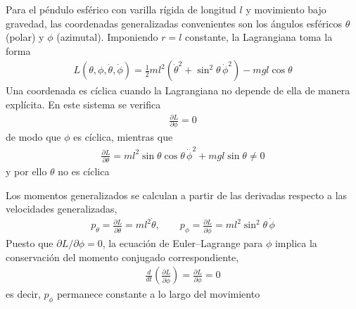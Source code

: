 \documentclass{article}
\begin{document}
Para el péndulo esférico con varilla rígida de longitud $l$ y movimiento bajo gravedad, las coordenadas generalizadas convenientes son los ángulos esféricos $\theta$ (polar) y $\phi$ (azimutal). Imponiendo $r=l$ constante, la Lagrangiana toma la forma
\begin{equation}
\begin{split}
L(\theta,\phi,\dot\theta,\dot\phi)
= \tfrac12 m l^2\!\left(\dot\theta^2 + \sin^2\theta\,\dot\phi^2\right) - m g l \cos\theta
\end{split}\label{eq:L-pendulo-esferico-ampliada}
\end{equation}
Una coordenada es cíclica cuando la Lagrangiana no depende de ella de manera explícita. En este sistema se verifica
\begin{equation}
\begin{split}
\frac{\partial L}{\partial \phi} = 0
\end{split}\label{eq:phi-ciclica-ampliada}
\end{equation}
de modo que $\phi$ es cíclica, mientras que
\begin{equation}
\begin{split}
\frac{\partial L}{\partial \theta} = m l^2 \sin\theta\cos\theta\,\dot\phi^2 + m g l \sin\theta \neq 0
\end{split}\label{eq:theta-no-ciclica-ampliada}
\end{equation}
y por ello $\theta$ no es cíclica

Los momentos generalizados se calculan a partir de las derivadas respecto a las velocidades generalizadas,
\begin{equation}
\begin{split}
p_\theta = \frac{\partial L}{\partial \dot\theta} = m l^2 \dot\theta,
\qquad
p_\phi = \frac{\partial L}{\partial \dot\phi} = m l^2 \sin^2\theta\,\dot\phi
\end{split}\label{eq:momentos-generalizados-ampliada}
\end{equation}
Puesto que $\partial L/\partial \phi = 0$, la ecuación de Euler–Lagrange para $\phi$ implica la conservación del momento conjugado correspondiente,
\begin{equation}
\begin{split}
\frac{d}{dt}\!\left(\frac{\partial L}{\partial \dot\phi}\right) = \frac{\partial L}{\partial \phi} = 0
\end{split}\label{eq:pphi-constante-ampliada}
\end{equation}
es decir, $p_\phi$ permanece constante a lo largo del movimiento
\end{document}
